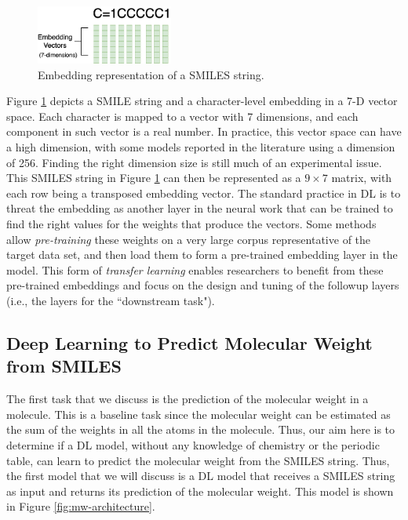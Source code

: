   \begin{figure}[htbp]
        \centering
        \includegraphics[width=0.4\textwidth]{figures/smileembedding.png}
        \caption{Embedding representation of a SMILES string.}
        \label{fig:smiles-to-embed}
    \end{figure}
Figure \ref{fig:smiles-to-embed} depicts a SMILE string and a  character-level embedding in a 7-D vector space. Each character is mapped to a vector with 7 dimensions, and each component in such vector is a real number.  In practice, this vector space can have a high dimension, with some models reported in the literature using a dimension of 256. Finding the right dimension size is still much of an experimental issue. This SMILES  string in 
Figure \ref{fig:smiles-to-embed} can then be represented as  a $9 \times 7$ matrix, with each row being a transposed embedding vector.
The standard practice in DL is to threat the embedding as  another layer in the neural work that can be trained to find the right values for the weights that produce the vectors. Some methods allow {\em pre-training} these weights on a very large corpus representative of the target data set, and then load them to form  a pre-trained embedding layer in the model. This form of {\em transfer learning} enables researchers to benefit from these pre-trained embeddings  and 
 focus on the design and tuning of the followup layers (i.e., the layers for the ``downstream task").

    \subsection{Deep Learning to Predict Molecular Weight from SMILES}
    The first task that we discuss is the prediction of the molecular weight in a molecule. This is a baseline task since the molecular weight can be estimated as the sum of the weights in all the atoms in the molecule. Thus, our aim here is to determine if  a DL model, without any knowledge of chemistry or the periodic table, can learn to predict the molecular weight from the SMILES string. Thus, the first model that we will discuss is a DL model that receives a SMILES string as input and returns its prediction of the molecular weight. This model is shown in Figure \ref{fig:mw-architecture}.
    
